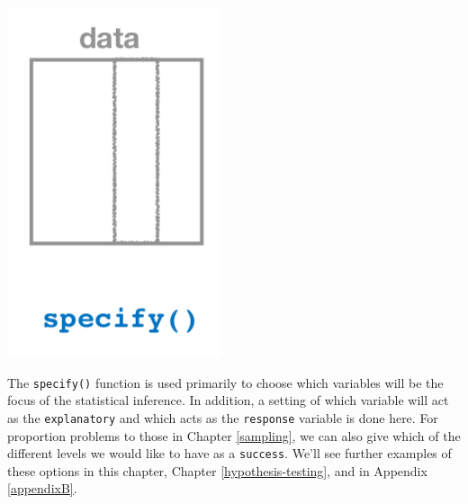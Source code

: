 \documentclass[12pt,]{krantz}
\theoremstyle{definition}
\theoremstyle{definition}
\theoremstyle{definition}
\theoremstyle{remark}
\begin{document}
\begin{center}\includegraphics[width=\textwidth]{images/flowcharts/infer/specify} \end{center}

The \texttt{specify()} function is used primarily to choose which
variables will be the focus of the statistical inference. In addition, a
setting of which variable will act as the \texttt{explanatory} and which
acts as the \texttt{response} variable is done here. For proportion
problems to those in Chapter \ref{sampling}, we can also give which of
the different levels we would like to have as a \texttt{success}. We'll
see further examples of these options in this chapter, Chapter
\ref{hypothesis-testing}, and in Appendix \ref{appendixB}.
\end{document}

